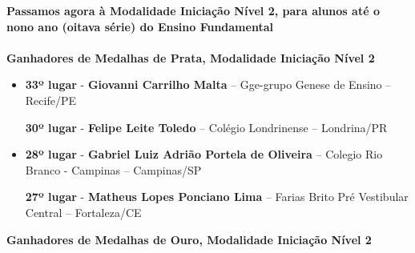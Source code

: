 \documentclass{article}
\begin{document}
\color{blue}
\textbf{Passamos agora à Modalidade Iniciação Nível 2, para alunos até o nono ano (oitava série) do Ensino Fundamental}\\\\
\textbf{\color{blue}Ganhadores de Medalhas de Prata, \color{black}Modalidade Iniciação Nível 2}
\color{black}

\begin{itemize}
\item
\textbf{33º lugar} - \textbf{Giovanni Carrilho Malta} – Gge-grupo Genese de Ensino – Recife/PE


\textbf{30º lugar} - \textbf{Felipe Leite Toledo} – Colégio Londrinense – Londrina/PR



\item
\textbf{28º lugar} - \textbf{Gabriel Luiz Adrião Portela de Oliveira} – Colegio Rio Branco - Campinas – Campinas/SP


\textbf{27º lugar} - \textbf{Matheus Lopes Ponciano Lima} – Farias Brito Pré Vestibular Central – Fortaleza/CE



\end{itemize}

\textbf{\color{blue}Ganhadores de Medalhas de Ouro, \color{black}Modalidade Iniciação Nível 2}
\color{black}
\end{document}
